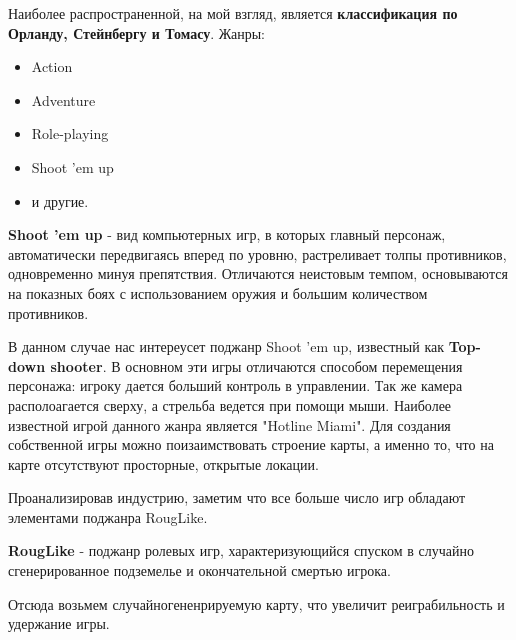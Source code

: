 \documentclass[14pt, titlepage,fleqn,a4paper]{extarticle}
\begin{document}
Наиболее распространенной, на мой взгляд, является \textbf{классификация по Орланду, Стейнбергу и Томасу}.
	Жанры:
	\begin{itemize}
		\item Action
		\item Adventure
		\item Role-playing
		\item Shoot 'em up
		\item и другие.
	\end{itemize}

\textbf{Shoot 'em up} - вид компьютерных игр, в которых главный персонаж, автоматически передвигаясь вперед по уровню, растреливает толпы противников, одновременно минуя препятствия. Отличаются неистовым темпом, основываются на показных боях с использованием оружия и большим количеством противников. 

В данном случае нас интереусет поджанр Shoot 'em up, известный как \textbf{Top-down shooter}. В основном эти игры отличаются способом перемещения персонажа: игроку дается больший контроль в управлении. Так же камера располоагается сверху, а стрельба ведется при помощи мыши. Наиболее известной игрой данного жанра является "Hotline Miami". Для создания собственной игры можно поизаимствовать строение карты, а именно то, что на карте отсутствуют просторные, открытые локации.

Проанализировав индустрию, заметим что все больше число игр обладают элементами поджанра RougLike.

\textbf{RougLike} - поджанр ролевых игр, характеризующийся спуском в случайно сгенерированное подземелье и окончательной смертью игрока.

Отсюда возьмем случайногененрируемую карту, что увеличит реиграбильность и удержание игры.
\end{document}
